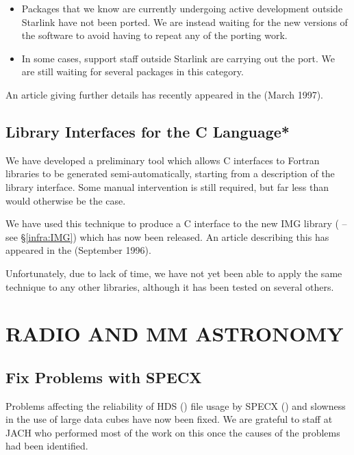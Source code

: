 \begin{itemize}
\item Packages that we know are currently undergoing active
development outside Starlink have not been ported. We are instead
waiting for the new versions of the software to avoid having to repeat
any of the porting work.

\item In some cases, support staff outside Starlink are carrying out
the port. We are still waiting for several packages in this category.
\end{itemize}

An article giving further details has recently appeared in the
 (March
1997).

\subsection{Library Interfaces for the C Language*}

We have developed a preliminary tool which allows C interfaces to
Fortran libraries to be generated semi-automatically, starting from a
description of the library interface. Some manual intervention is
still required, but far less than would otherwise be the case.

We have used this technique to produce a C interface to the new IMG
library ( -- see \S\ref{infra:IMG}) which has
now been released. An article describing this has appeared in the
 (September
1996).

Unfortunately, due to lack of time, we have not yet been able to apply
the same technique to any other libraries, although it has been tested
on several others.

\section{RADIO AND MM ASTRONOMY}

\subsection{Fix Problems with SPECX}

Problems affecting the reliability of HDS ()
file usage by SPECX () and slowness in the use
of large data cubes have now been fixed. We are grateful to staff at
JACH who performed most of the work on this once the causes of the
problems had been identified.

